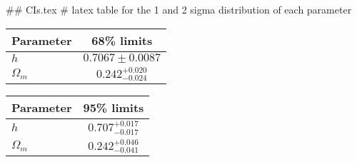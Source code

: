## CIs.tex
# latex table for the 1 and 2 sigma distribution of each parameter

\begin{tabular} { l  c}
 Parameter &  68\% limits\\
\hline
{\boldmath$h              $} & $0.7067\pm 0.0087          $\\
{\boldmath$\Omega_m       $} & $0.242^{+0.020}_{-0.024}   $\\
\hline
\end{tabular}

\begin{tabular} { l  c}
 Parameter &  95\% limits\\
\hline
{\boldmath$h              $} & $0.707^{+0.017}_{-0.017}   $\\
{\boldmath$\Omega_m       $} & $0.242^{+0.046}_{-0.041}   $\\
\hline
\end{tabular}
